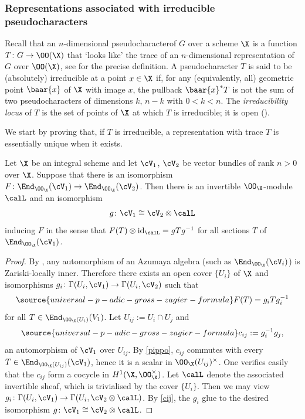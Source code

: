 \subsubsection{Representations associated with irreducible pseudocharacters} Recall that an $n$-dimensional   pseudocharacterof $G$ over  a scheme $\X$ is a function $T\colon G\to \OO(\X)$  that `looks like' the trace of an $n$-dimensional representation of $G$ over $\OO(\X)$, see  \cite{rou} for the precise definition. A pseudocharacter $T$ is said to be (absolutely) irreducible  at a point $x\in \X$ if, for any (equivalently, all) geometric point $\baar{x}$ of $\X$ with image $x$, the pullback $\baar{x}^{*}T$  is not the sum of two  pseudocharacters of dimensions $k$, $n-k$ with $0< k<n$. The \emph{irreducibility locus} of $T$ is the set of points of $\X$ at which $T$ is irreducible; it is open  (\cite[\S~7.2.3]{chenevier}).

We start by proving that, if $T$ is irreducible, a  representation with trace $T$ is essentially unique when it exists.


\begin{lemm} Let $\X$ be an integral scheme and let  $\cV_{1}$, $\cV_{2}$ be vector bundles of rank $n>0$ over $\X$. Suppose that there is an isomorphism $F\colon \End_{\OO_{\X}}(\cV_{1})\to \End_{\OO_{\X}}(\cV_{2})$. Then there is an invertible $\OO_{\X}$-module $\calL$ and an isomorphism
$$g \colon \cV_{1}\cong \cV_{2}\otimes \calL$$ inducing $F$ in the sense that
$F(T)\otimes{\rm id}_{\calL} =g Tg^{-1}$
for all sections $T$ of $\End_{\OO_{\X}}(\cV_{1})$.
\end{lemm}
\begin{proof}
By \cite[Ch. IV]{knus}, any automorphism of an Azumaya  algebra (such as $ \End_{\OO_{\X}}(\cV_{i})$) is Zariski-locally inner.  Therefore there exists an open cover $\{U_{i}\}$ of $\X$ and isomorphisms $g_{i}\colon \Gamma(U_{i}, \cV_{1})\to \Gamma(U_{i}, \cV_{2})$ such that
\begin{align}
\label{pippo}
\source{universal-p-adic-gross-zagier-formula}
F(T)=g_{i}Tg_{i}^{-1}\end{align} for all $T \in \End_{\OO_{\X}(U_{i})}(V_{1})$. Let $U_{ij}:=U_{i}\cap U_{j}$ and
\begin{align}\label{cij}
\source{universal-p-adic-gross-zagier-formula}
c_{ij}:=g_{i}^{-1}g_{j},
\end{align}
an automorphism of $\cV_{1}$ over $U_{ij}$.  By \eqref{pippo},  $c_{ij} $ commutes with every $T \in \End_{\OO_{\X}(U_{ij})}(\cV_{1})$, hence it is a scalar in $\OO_{\X}(U_{ij})^{\times}$. One verifies easily that the $c_{ij}$ form a cocycle in $H^{1}(\X,\OO_{\X}^{\times})$. Let $\calL$ denote the associated invertible sheaf, which is trivialised by  the cover $\{U_{i}\}$. Then we may view  $g_{i}\colon \Gamma(U_{i}, \cV_{1})\to \Gamma(U_{i}, \cV_{2}\otimes \calL)$. By \eqref{cij}, the $g_{i}$ glue to the desired isomorphism $g\colon \cV_{1}\cong \cV_{2}\otimes \calL$.
\end{proof}

